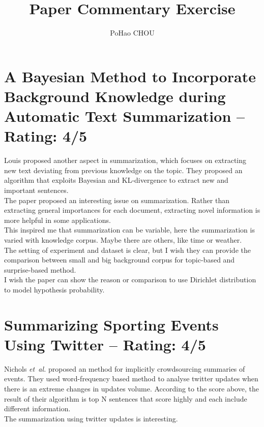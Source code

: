 \documentclass[a4paper]{article}
\title{Paper Commentary Exercise}
\author{PoHao CHOU}
\begin{document}
\maketitle
\section{A Bayesian Method to Incorporate Background Knowledge during Automatic Text Summarization -- Rating: 4/5}
Louis \cite{Louis:ACL14} proposed another aspect in summarization, which focuses on extracting new text deviating from previous knowledge on the topic. They proposed an algorithm that exploits Bayesian and KL-divergence to extract new and important sentences.\\

The paper proposed an interesting issue on summarization. Rather than extracting general importances for each document, extracting novel information is more helpful in some applications.\\

This inspired me that summarization can be variable, here the summarization is varied with knowledge corpus. Maybe there are others, like time or weather.\\ 

The setting of experiment and dataset is clear, but I wish they can provide the comparison between small and big background corpus for topic-based and surprise-based method.\\

I wish the paper can show the reason or comparison to use Dirichlet distribution to model hypothesis probability.


\section{Summarizing Sporting Events Using Twitter -- Rating: 4/5}
Nichols \emph{et~al.} \cite{Nichols:IUI12} proposed an method for implicitly crowdsourcing summaries of events. They used word-frequency based method to analyse twitter updates when there is an extreme changes in updates volume. According to the score above, the result of their algorithm is top N sentences that score highly and each include different information.\\

The summarization using twitter updates is interesting.\\
\end{document}
